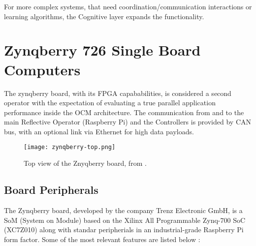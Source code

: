 For more complex systems, that need coordination/communication interactions or learning algorithms,
the Cognitive layer expands the functionality.

\section{Zynqberry 726 Single Board Computers}

The zynqberry board, with its FPGA capababilities, is considered a second operator with the
expectation of evaluating a true parallel application performance inside the OCM architecture. The
communication from and to the main Reflective Operator (Raspberry Pi) and the Controllers is
provided by CAN bus, with an optional link via Ethernet for high data payloads.

\begin{figure}[htp]
	\centering
	\texttt{[image: zynqberry-top.png]}
	\caption{Top view of the Znyqberry board, from \cite{zynq-main}.} \label{fig:znyqtop}
\end{figure}

\subsection{Board Peripherals}

The Zynqberry board, developed by the company Trenz Electronic GmbH, is a SoM (System on Module)
based on the Xilinx All Programmable Zynq-700 SoC (XC7Z010) along with standar peripherials in an
industrial-grade Raspberry Pi form factor. Some of the most relevant features are listed below
\cite{zynq-main}:

